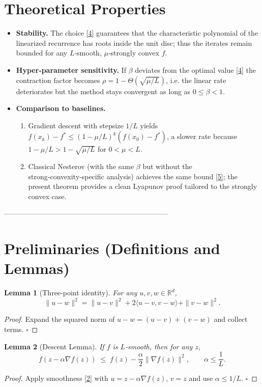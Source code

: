 \documentclass{article}
\newtheorem{lemma}{Lemma}
\newcommand{\grad}{\nabla}
\newcommand{\R}{\mathbb{R}}
\begin{document}
\section*{Theoretical Properties}
\begin{itemize}
\item \textbf{Stability.} The choice \eqref{4} guarantees that the characteristic polynomial of the linearized recurrence has roots inside the unit disc; thus the iterates remain bounded for any $L$‑smooth, $\mu$‑strongly convex $f$.
\item \textbf{Hyper‑parameter sensitivity.} If $\beta$ deviates from the optimal value \eqref{4} the contraction factor becomes $\rho = 1-\Theta(\sqrt{\mu/L})$, i.e. the linear rate deteriorates but the method stays convergent as long as $0\le\beta<1$.
\item \textbf{Comparison to baselines.}
   \begin{enumerate}
   \item Gradient descent with stepsize $1/L$ yields $f(x_{k})-f^{\ast}\le (1-\mu/L)^{k}(f(x_{0})-f^{\ast})$, a slower rate because $1-\mu/L > 1-\sqrt{\mu/L}$ for $0<\mu<L$.
   \item Classical Nesterov (with the same $\beta$ but without the strong‑convexity‑specific analysis) achieves the same bound \eqref{5}; the present theorem provides a clean Lyapunov proof tailored to the strongly convex case.
   \end{enumerate}
\end{itemize}

---------------------------------------------------------------------

\section*{Preliminaries (Definitions and Lemmas)}
\begin{lemma}[Three‑point identity]\label{lem:three}
For any $u,v,w\in\R^{d}$,
\[
\|u-w\|^{2}= \|u-v\|^{2}+2\langle u-v , v-w\rangle+\|v-w\|^{2}.
\tag{6}
\]
\end{lemma}
\begin{proof}
Expand the squared norm of $u-w=(u-v)+(v-w)$ and collect terms. \hfill $\square$
\end{proof}

\begin{lemma}[Descent Lemma]\label{lem:descent}
If $f$ is $L$‑smooth, then for any $z$,
\[
f(z-\alpha\grad f(z))\;\le\; f(z)-\frac{\alpha}{2}\|\grad f(z)\|^{2},
\qquad \alpha\le\frac{1}{L}.
\tag{7}
\]
\end{lemma}
\begin{proof}
Apply smoothness \eqref{2} with $u=z-\alpha\grad f(z)$, $v=z$ and use $\alpha\le1/L$. \hfill $\square$
\end{proof}
\end{document}
